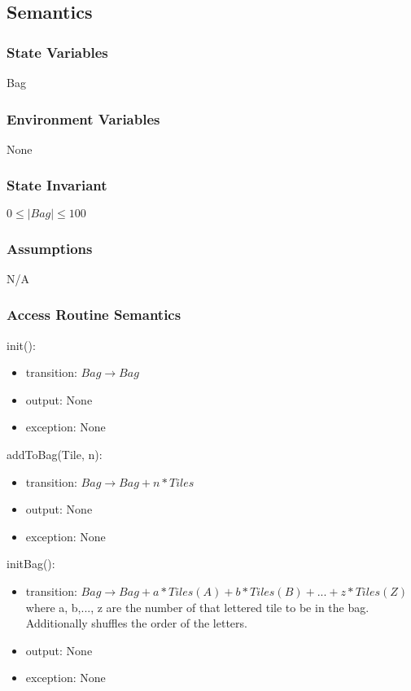\documentclass[12pt]{article}
\begin{document}
\subsection* {Semantics}

\subsubsection* {State Variables}

Bag \\

\subsubsection* {Environment Variables}
None
\subsubsection* {State Invariant}

$0 \leq |Bag| \leq 100$

\subsubsection* {Assumptions}

N/A

\begin{itemize}

\end{itemize}

\subsubsection* {Access Routine Semantics}

\noindent init():
\begin{itemize}
\item transition: $Bag \rightarrow Bag$
\item output: None
\item exception: None
\end{itemize}

\noindent addToBag(Tile, n):
\begin{itemize}
\item transition: $Bag \rightarrow Bag+n*Tiles$
\item output: None
\item exception: None
\end{itemize}

\noindent initBag():
\begin{itemize}
\item transition: $Bag \rightarrow Bag+a*Tiles(A)+b*Tiles(B)+...+z*Tiles(Z)$\\
where a, b,..., z are the number of that lettered tile to be in the bag.\\ Additionally shuffles the order of the letters.
\item output: None
\item exception: None
\end{itemize}
\end{document}
